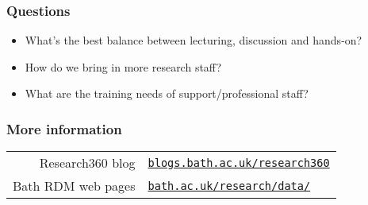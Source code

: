 \documentclass[handout]{beamer}
\newcommand{\shorturl}[2]%
  [?utm\_source=jsc\&utm\_medium=presentation\&utm\_campaign=jiscmrd\_workshop\_oct\_2012]%
  {\href{http://#2#1}{\nolinkurl{#2}}}
\begin{document}
\begin{frame}
  \frametitle{Questions}
  
  \begin{itemize}
    \item What's the best balance between lecturing, discussion and hands-on?
    \item How do we bring in more research staff?
    \item What are the training needs of support/professional staff?
  \end{itemize}
\end{frame}

\begin{frame}
  \frametitle{More information}

  \begin{center}
    \begin{tabular}{rl}
      \toprule
      Research360 blog  & \shorturl{blogs.bath.ac.uk/research360} \\
      Bath RDM web pages & \shorturl{bath.ac.uk/research/data/} \\
      \bottomrule
    \end{tabular}
    
    \bigskip
    \href{http://creativecommons.org/licenses/by-sa/3.0/}{\ccbysa}
  \end{center}
\end{frame}
\end{document}
